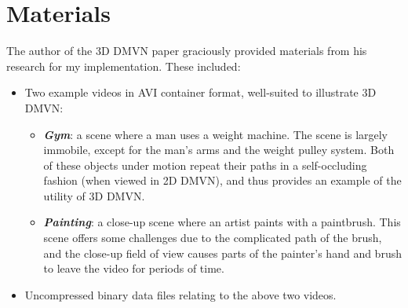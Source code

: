\section{Materials}
The author of the 3D DMVN paper graciously provided materials from his research for my implementation. These included:
\begin{itemize}
    \item Two example videos in AVI container format, well-suited to illustrate 3D DMVN:
    \begin{itemize}
    \item \textbf{\emph{Gym}}: a scene where a man uses a weight machine. The scene is largely immobile, except for the man's arms and the weight pulley system. Both of these objects under motion repeat their paths in a self-occluding fashion (when viewed in 2D DMVN), and thus provides an example of the utility of 3D DMVN.
    \item \textbf{\emph{Painting}}: a close-up scene where an artist paints with a paintbrush. This scene offers some challenges due to the complicated path of the brush, and the close-up field of view causes parts of the painter's hand and brush to leave the video for periods of time.
    \end{itemize}
    \item Uncompressed binary data files relating to the above two videos.
\end{itemize}

